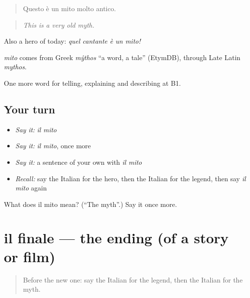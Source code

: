 \begin{quote}
Questo è un mito molto antico.
\end{quote}

\begin{quote}
\emph{This is a very old myth.}
\end{quote}

Also a hero of today: \emph{quel cantante è un mito!}

\begin{cousinweb}
\emph{mito} comes from Greek \emph{mŷthos} \textquotedblleft{}a word, a tale\textquotedblright{} (EtymDB), through Late Latin \emph{mythos}.
\end{cousinweb}

\begin{grammarlens}[title={What you've built}]
One more word for telling, explaining and describing at B1.
\end{grammarlens}

\subsection*{Your turn}
\begin{itemize}
\raggedright
  \item \emph{Say it:} \emph{il mito}
  \item \emph{Say it:} \emph{il mito}, once more
  \item \emph{Say it:} a sentence of your own with \emph{il mito}
  \item \emph{Recall:} say the Italian for the hero, then the Italian for the legend, then say \emph{il mito} again
\end{itemize}

\begin{tcolorbox}[breakable,colback=teal!4,colframe=teal!35!black,title={Before you move on}]
What does il mito mean? (\textquotedblleft{}The myth\textquotedblright{}.) Say it once more.
\end{tcolorbox}
\section[il finale]{il finale — the ending (of a story or film)}

\label{lesson:IT-C324-finale}



\begin{quote}
Before the new one: say the Italian for the legend, then the Italian for the myth.
\end{quote}

